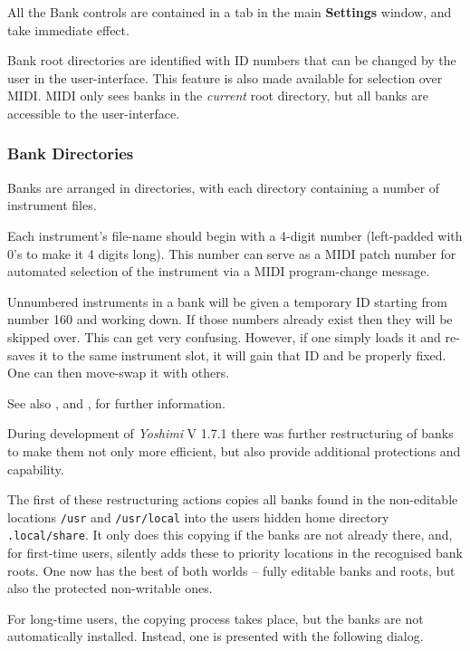    All the Bank controls are contained in a tab in the main
   \textbf{Settings} window, and take immediate effect.

   Bank root directories are identified with ID numbers that can be changed
   by the user in the user-interface. This feature is also made available for
   selection over MIDI.  MIDI only sees banks in the \textsl{current} root
   directory, but all banks are accessible to the user-interface.

\subsubsection{Bank Directories}
\label{subsubsec:banks_and_roots_bank_directories}

   Banks are arranged in directories, with each directory containing a number
   of instrument files.

   Each instrument's file-name should begin with a 4-digit number
   (left-padded with 0's to make it 4 digits long).  This number can serve
   as a MIDI patch number for automated selection of the instrument via a
   MIDI program-change message.

   Unnumbered instruments in a bank will be given a temporary ID starting
   from number 160 and working down. If those numbers already exist then
   they will be skipped over. This can get very confusing. However, if one
   simply loads it and re-saves it to the same instrument slot, it will gain
   that ID and be properly fixed.  One can then move-swap it with others.

   See also , and
   , for further information.

   During development of \textsl{Yoshimi} V 1.7.1 there was further
   restructuring of banks to make them not only more efficient, but also provide
   additional protections and capability.

   The first of these restructuring actions copies all banks found in the
   non-editable locations \texttt{/usr} and \texttt{/usr/local} into the users
   hidden home directory \texttt{.local/share}. It only does this copying if the
   banks are not already there, and, for first-time users, silently adds these
   to priority locations in the recognised bank roots. One now has the best of
   both worlds -- fully editable banks and roots, but also the protected
   non-writable ones.

   For long-time users, the copying process takes place, but the banks are not
   automatically installed. Instead, one is presented with the following dialog.

